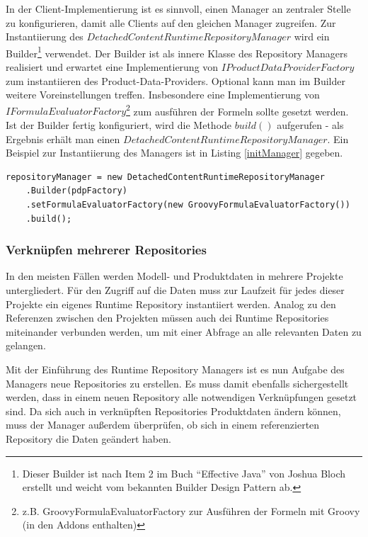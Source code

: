 \documentclass[headsepline=true, footsepline=true]{scrartcl}
\begin{document}
In der Client-Implementierung ist es sinnvoll, einen Manager an zentraler Stelle
zu konfigurieren, damit alle Clients auf den gleichen Manager zugreifen. Zur
Instantiierung des $DetachedContentRuntimeRepositoryManager$ wird ein
Builder\footnote{Dieser Builder ist nach Item 2 im Buch "`Effective Java"' von
Joshua Bloch \cite{effectiveJava} erstellt und weicht vom bekannten Builder
Design Pattern ab.} verwendet. Der Builder ist als innere Klasse des
Repository Managers realisiert und erwartet eine Implementierung von
$IProductDataProviderFactory$ zum instantiieren des Product-Data-Providers.
Optional kann man im Builder weitere Voreinstellungen treffen. Insbesondere eine Implementierung von $IFormulaEvaluatorFactory$\footnote{z.B.
GroovyFormulaEvaluatorFactory zur Ausführen der Formeln mit Groovy (in den
Addons enthalten)} zum ausführen der Formeln sollte gesetzt werden. Ist der
Builder fertig konfiguriert, wird die Methode $build()$ aufgerufen - als Ergebnis erhält man einen $DetachedContentRuntimeRepositoryManager$. Ein
Beispiel zur Instantiierung des Managers ist in Listing \ref{initManager}
gegeben.

\begin{lstlisting}[caption=Initialize DetachedContentRuntimeRepositoryManager,
label=initManager]
repositoryManager = new DetachedContentRuntimeRepositoryManager
	.Builder(pdpFactory)
	.setFormulaEvaluatorFactory(new GroovyFormulaEvaluatorFactory())
	.build();
\end{lstlisting}

\subsubsection{Verknüpfen mehrerer Repositories}

In den meisten Fällen werden Modell- und Produktdaten in mehrere Projekte
untergliedert. Für den Zugriff auf die Daten muss zur Laufzeit für jedes dieser
Projekte ein eigenes Runtime Repository instantiiert werden.
Analog zu den Referenzen zwischen den Projekten müssen auch dei Runtime
Repositories miteinander verbunden werden, um mit einer Abfrage an alle
relevanten Daten zu gelangen.

Mit der Einführung des Runtime Repository Managers ist es nun Aufgabe des
Managers neue Repositories zu erstellen. Es muss damit ebenfalls sichergestellt
werden, dass in einem neuen Repository alle notwendigen Verknüpfungen gesetzt
sind. Da sich auch in verknüpften Repositories Produktdaten ändern können, muss
der Manager außerdem überprüfen, ob sich in einem referenzierten Repository die
Daten geändert haben.
\end{document}
